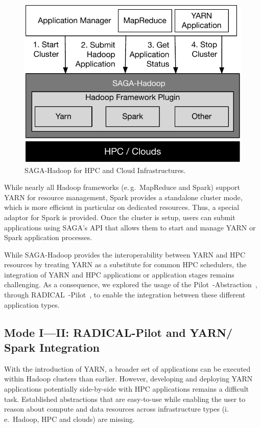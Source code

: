 \begin{figure}[t]
    \centering
    \includegraphics[width=.95\textwidth]{figures/data_analytics_hpc/hpc_hadoop/pilot-abds.pdf}
    \caption{SAGA-Hadoop for HPC and Cloud Infrastructures.}
    \label{fig:saga-hadoop}
\end{figure}

While nearly all Hadoop frameworks (e.\,g.\ MapReduce and Spark) support YARN for resource management, Spark provides a standalone cluster mode, which is more efficient in particular on dedicated resources.
Thus, a special adaptor for Spark is provided.
Once the cluster is setup, users can submit applications using SAGA's API that allows them to start and manage YARN or Spark application processes.

While SAGA-Hadoop provides the interoperability between YARN and HPC resources by treating YARN as a substitute for common HPC schedulers, the integration of YARN and HPC applications or application stages remains challenging.
As a consequence, we explored the usage of the Pilot~-Abstraction~\cite{luckow2012pstar}, through RADICAL~-Pilot~\cite{merzky2019using}, to enable the integration between these different application types.
\subsection{Mode I---II: RADICAL-Pilot and YARN/ Spark Integration}
\label{ssec:rp-impl}
With the introduction of YARN, a broader set of applications can be executed within Hadoop clusters than earlier.
However, developing and deploying YARN applications potentially side-by-side with HPC applications remains a difficult task.
Established abstractions that are easy-to-use while enabling the user to reason about compute and data resources across infrastructure types (i.\,e.\ Hadoop, HPC and clouds) are missing. 

